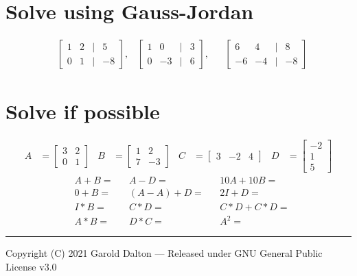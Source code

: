 \documentclass[14pt]{extarticle}
\begin{document}
\section*{Solve using Gauss-Jordan}
\begin{align*}
	&\begin{bmatrix}
		1 & 2 & | & 5 \\
		0 & 1 & | & -8
	\end{bmatrix},  & 
	\begin{bmatrix}
		1 & 0 & | & 3 \\
		0 & -3 & | & 6
	\end{bmatrix}, & &
	\begin{bmatrix}
		6 & 4 & | & 8 \\
		-6 & -4 & | & -8
	\end{bmatrix}
\end{align*}

\section*{Solve if possible}
\begin{align*}
	A &= \begin{bmatrix}
		3 & 2  \\
		0 & 1 
	\end{bmatrix}
	& B &= \begin{bmatrix}
		1 & 2 \\
		7 & -3
	\end{bmatrix}
	& C &= \begin{bmatrix}
		3 & -2 & 4
	\end{bmatrix}
	& D &= \begin{bmatrix}
		-2 \\
		1 \\
		5
	\end{bmatrix}
\end{align*}
\begin{align*}
	&A+B= & &A-D= & &10A + 10B= \\
	&0+B= & &(A-A) +D= && 2I +D= \\
	&I*B= & &C*D= && C*D + C*D= \\
	&A*B= & &D*C= && A^2=
\end{align*}

\noindent\rule{\textwidth}{1pt}
{\footnotesize Copyright (C) 2021 Garold Dalton --- Released under GNU General Public License v3.0}
\end{document}
